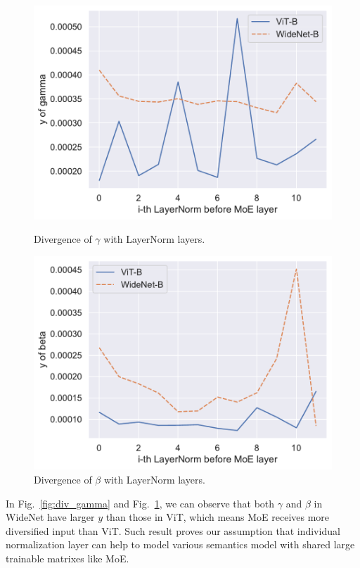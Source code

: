 \documentclass[letterpaper]{article} %
\begin{document}
\begin{figure}
\centering
\begin{minipage}[b]{.45\textwidth}
\includegraphics[width=\textwidth]{div_gamma.pdf}
\caption{Divergence of $\gamma$ with LayerNorm layers.}\label{fig:div_gamma}
\end{minipage}\hfill
\begin{minipage}[b]{.45\textwidth}
\includegraphics[width=\textwidth]{div_beta.pdf}
\caption{Divergence of $\beta$ with LayerNorm layers.}\label{fig:div_beta}
\end{minipage}
\end{figure}

In Fig.~\ref{fig:div_gamma} and Fig.~\ref{fig:div_beta}, we can observe that both $\gamma$ and $\beta$ in WideNet have larger $y$ than those in ViT, which means MoE receives more diversified input than ViT. Such result proves our assumption that individual normalization layer can help to model various semantics model with shared large trainable matrixes like MoE. 
\end{document}
